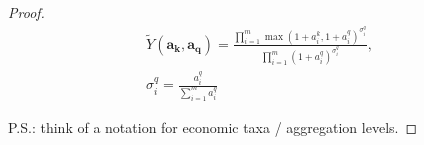 {\begin{proof}
\begin{gather}
            \tilde{Y}(
                \boldsymbol{a_k},
                \boldsymbol{a_q}
                ) =
                \frac{
                    \prod_{i=1}^{m}{
                        {
                            \max(
                                1 + a_{i}^{k},
                                1 + a_{i}^{q}
                            )
                        } ^ {
                            \sigma_{i}^{q}
                        }
                    }
                }{
                    \prod_{i=1}^{m}{
                        {
                            (
                                1 + a_{i}^{q}
                            )
                        } ^ {
                            \sigma_{i}^{q}
                        }
                    }
                }
                ,\\
                \sigma_{i}^{q} = 
                \frac{
                    a_{i}^{q}
                }{
                    \sum_{i=1}^{m}{
                        a_{i}^{q}
                    }
                }
        \end{gather}
        
        P.S.: think of a notation for economic taxa / aggregation levels.
        

\end{proof}}
